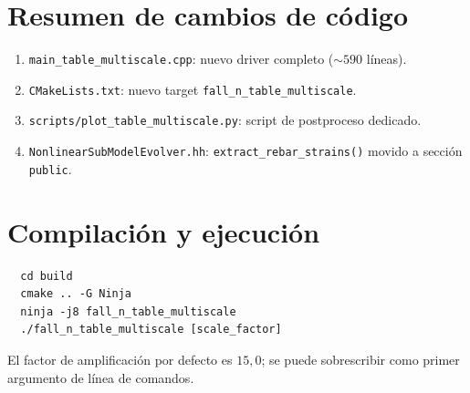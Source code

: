 \section{Resumen de cambios de código}

\begin{enumerate}
  \item \texttt{main\_table\_multiscale.cpp}: nuevo driver completo ($\sim 590$ líneas).
  \item \texttt{CMakeLists.txt}: nuevo target \texttt{fall\_n\_table\_multiscale}.
  \item \texttt{scripts/plot\_table\_multiscale.py}: script de postproceso dedicado.
  \item \texttt{NonlinearSubModelEvolver.hh}: \texttt{extract\_rebar\_strains()} movido a sección \texttt{public}.
\end{enumerate}

\section{Compilación y ejecución}

\begin{verbatim}
  cd build
  cmake .. -G Ninja
  ninja -j8 fall_n_table_multiscale
  ./fall_n_table_multiscale [scale_factor]
\end{verbatim}

El factor de amplificación por defecto es $15{,}0$; se puede sobrescribir
como primer argumento de línea de comandos.
